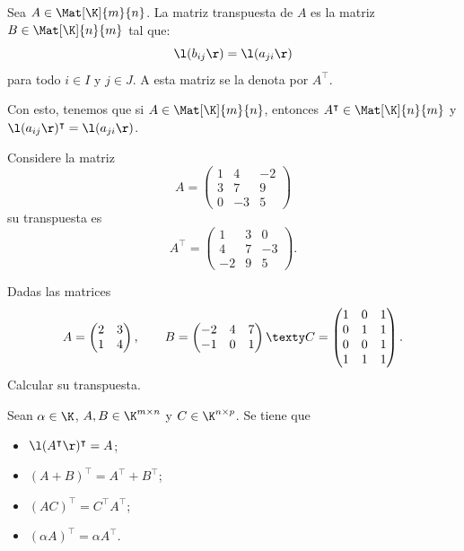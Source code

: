 \documentclass[compacto,10pt]{pubciencias-notas}
\begin{document}
\begin{defi}
Sea $A \in \Mat[\K]{m}{n}$. La matriz transpuesta de $A$ es la matriz $B\in \Mat[\K]{n}{m}$ tal que: 
\[
    \l(b_{ij}\r) = \l(a_{ji}\r)
\]
para todo $i\in I$ y $j \in J$. A esta matriz se la denota por $A^\intercal$.
\end{defi}

\begin{advertencia}
    Con esto, tenemos que si $A\in \Mat[\K]{m}{n}$, entonces $A^\intercal\in \Mat[\K]{n}{m}$ y $\l(a_{ij}\r)^\intercal =\l(a_{ji}\r)$.
\end{advertencia}

\begin{ejem}\hspace{0pt} 
Considere la matriz
\[ 
A= 
\begin{pmatrix}
 1 &4  & -2   \\ 
  3& 7 &   9 \\ 
 0 & -3 & 5  
\end{pmatrix}
\]
su transpuesta es
\[
A^\intercal= 
\begin{pmatrix}
1 & 3 & 0   \\ 
4 & 7  &-3    \\ 
-2 & 9 & 5  
\end{pmatrix}.
\]	
\end{ejem}

\begin{ejer}\hspace{0pt} Dadas las matrices
\[
    A = \begin{pmatrix}2&3\\1&4\end{pmatrix},
    \qquad
    B = \begin{pmatrix}-2&4&7\\-1&0&1\end{pmatrix}
    \texty
    C = \begin{pmatrix}1&0&1\\0&1&1\\0&0&1\\1&1&1\end{pmatrix}.
\]
Calcular su transpuesta.
\end{ejer}

\begin{teo}\label{Mat:PropTrans}
    Sean $\alpha \in \K$, $A,B\in\K^{m \times n}$ y  $C\in\K^{n \times p}$. Se tiene que
    \begin{itemize}
    \item[$a)$] 
        $\l(A^\intercal\r)^\intercal = A$;
    \item[$b)$] 
        $(A+B)^\intercal = A^{\intercal} + B^{\intercal}$;
    \item[$c)$] 
        $(AC)^\intercal = C^\intercal A^\intercal$;
    \item[$d)$] 
        $(\alpha A)^\intercal = \alpha A^\intercal$.
    \end{itemize}
\end{teo}
\end{document}
